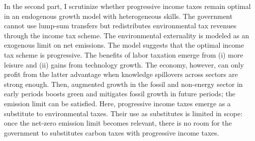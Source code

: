 In the second part, I scrutinize whether progressive income taxes remain optimal in an endogenous growth model with heterogeneous skills. The government cannot use lump-sum transfers but redistributes environmental tax revenues through the income tax scheme. The environmental externality is modeled as an exogenous limit on net emissions. 
 The model suggests that the optimal income tax scheme is progressive. The benefits of labor taxation emerge from (i) more leisure and (ii) gains from technology growth.
 The economy, however, can only profit from the latter advantage when knowledge spillovers across sectors are strong enough. Then, augmented growth in the fossil and non-energy sector in early periods boosts green and mitigates fossil growth in future periods; the emission limit can be satisfied. Here, progressive income taxes emerge as a substitute to environmental taxes. Their use as substitutes is limited in scope: once the net-zero emission limit becomes relevant, there is no room for the government to substitutes carbon taxes with progressive income taxes.
 
% 
 
 

